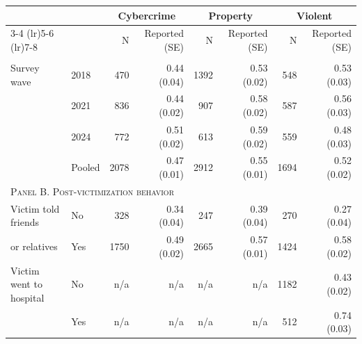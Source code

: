 \begin{tabular}{p{1.9in}p{1.5in}rrrrrr}
	\toprule
	&  & \multicolumn{2}{c}{{Cybercrime    }} & \multicolumn{2}{c}{{Property    }} & \multicolumn{2}{c}{{Violent    }} \\ 
	\cmidrule(lr){3-4} \cmidrule(lr){5-6} \cmidrule(lr){7-8}
	&     & N & Reported (SE) & N  & Reported (SE)  & N   & Reported (SE)   \\ 
	\midrule\addlinespace[4pt]
	\multicolumn{8}{l}{\textsc{Panel A. Totals}} \\
	Survey wave & 2018 & 470 & 0.44 (0.04) & 1392 & 0.53 (0.02) & 548 & 0.53 (0.03) \\ 
	& 2021 & 836 & 0.44 (0.02) & 907 & 0.58 (0.02) & 587 & 0.56 (0.03) \\ 
	& 2024 & 772 & 0.51 (0.02) & 613 & 0.59 (0.02) & 559 & 0.48 (0.03) \\ 
	& Pooled & 2078 & 0.47 (0.01) & 2912 & 0.55 (0.01) & 1694 & 0.52 (0.02) \\ 
	
	 \midrule
	\multicolumn{8}{l}{\textsc{Panel B. Post-victimization behavior}} \\
	Victim told friends & No & 328 & 0.34 (0.04) & 247 & 0.39 (0.04) & 270 & 0.27 (0.04) \\ 
	or relatives & Yes & 1750 & 0.49 (0.02) & 2665 & 0.57 (0.01) & 1424 & 0.58 (0.02) \\ 
		 	\addlinespace[4pt]
	Victim went to hospital & No & n/a &  n/a &  n/a &  n/a  & 1182 & 0.43 (0.02) \\ 
	& Yes & n/a &  n/a &  n/a &  n/a  & 512 & 0.74 (0.03) \\ 
	

\end{tabular}
